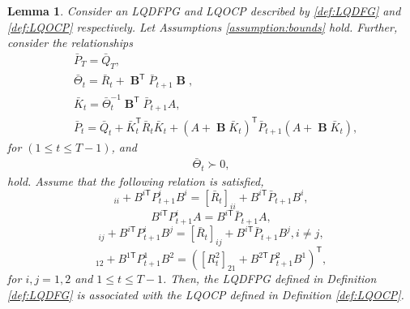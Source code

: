 \documentclass{article}
\newcommand{\transpose}{\mathsf{T}}
\DeclareMathOperator{\contB}{\mathbf{B}}
\newtheorem{lemma}{Lemma}
\begin{document}
\begin{lemma}\label{lemma:gamePGrelation}
    Consider an LQDFPG and LQOCP described by \ref{def:LQDFG} and \ref{def:LQOCP} respectively. Let Assumptions \ref{assumption:bounds} hold. Further, consider the relationships
    \begin{align*}
        &\bar{P}_{T} = \bar{Q}_{T},\\
        &\bar{\Theta}_{t} = \bar{R}_{t} + \contB^{\transpose}\bar{P}_{t+1}\contB,\\
        &\bar{K}_{t} = \bar{\Theta}_{t}^{-1}\contB^{\transpose}\bar{P}_{t+1}A,\\
        &\bar{P}_{t} = \bar{Q}_{t} + \bar{K}_{t}^{\transpose}\bar{R}_{t}\bar{K}_{t} + (A+\contB\bar{K}_{t})^{\transpose}\bar{P}_{t+1}(A+\contB\bar{K}_{t}),
    \end{align*}
    for $(1\leq t \leq T-1)$,
    and
    \begin{align*}
        \bar{\Theta}_{t} \succ 0,
    \end{align*}
    hold.
    Assume that the following relation is satisfied,
    \begin{equation}
        [R_{t}^{i}]_{ii} + B^{i\transpose}P_{t+1}^{i}B^{i} = [\bar{R}_{t}]_{ii} + B^{i\transpose}\bar{P}_{t+1}B^{i},
    \end{equation}
    \begin{equation}
        B^{i\transpose}P_{t+1}^{i}A = B^{i\transpose}\bar{P}_{t+1}A,
    \end{equation}
    \begin{equation}
        [R_{t}^{i}]_{ij} + B^{i\transpose}P_{t+1}^{i}B^{j} = [\bar{R}_{t}]_{ij} + B^{i\transpose}\bar{P}_{t+1}B^{j},i\neq j,
    \end{equation}
    \begin{equation}
        [R_{t}^{1}]_{12} + B^{1\transpose}P_{t+1}^{1}B^{2} = ([R^{2}_{t}]_{21} + B^{2\transpose}P^{2}_{t+1}B^{1})^{\transpose},
    \end{equation}
    for $i,j=1,2$ and $1\leq t \leq T-1$. Then, the LQDFPG defined in Definition \ref{def:LQDFG} is associated with the LQOCP defined in Definition \ref{def:LQOCP}.
\end{lemma}
\end{document}
